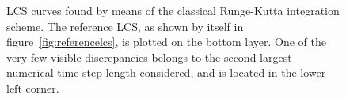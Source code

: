 \begin{figure}[htpb]
    \centering
    
    \caption[LCS curves found by means of the classical Runge-Kutta integration scheme]{
        LCS curves found by means of the classical Runge-Kutta integration scheme. The
        reference LCS, as shown by itself in figure~\ref{fig:referencelcs},
        is plotted on the bottom layer. One of the very few visible
        discrepancies belongs to the second largest numerical time step length
        considered, and is located in the lower left corner.}
    \label{fig:lcs_rk4}
\end{figure}
